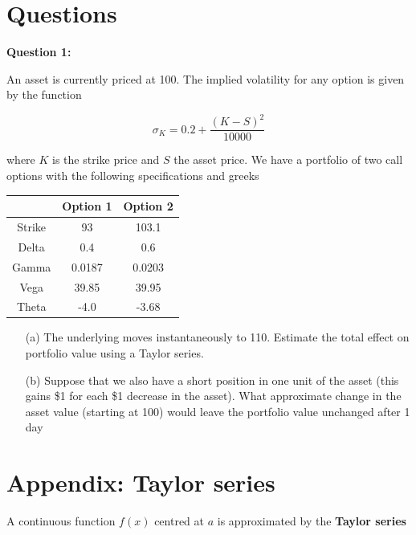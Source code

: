 \section*{Questions}

\textbf{Question 1:}

An asset is currently priced at 100. The implied volatility for any option is given by the function

\[ \sigma_K =  0.2 +  \frac{(K-S)^2}{10000} \]

where $K$ is the strike price and $S$ the asset price. We have a portfolio of two call options with the following specifications and greeks


\begin{center}
\begin{tabular}{|c|c|c|}
\hline
 & Option 1 & Option 2\\
 \hline
 Strike & 93 & 103.1\\
 Delta & 0.4 & 0.6\\
 Gamma & 0.0187 & 0.0203\\
 Vega & 39.85 & 39.95\\
 Theta & -4.0 & -3.68\\
\hline
\end{tabular}
\end{center}

\begin{itemize}
\item[(a)] The underlying moves instantaneously to 110. Estimate the total effect on portfolio value using a Taylor series.
\item[(b)] Suppose that we also have a short position in one unit of the asset (this gains \$1 for each \$1 decrease in the asset). What approximate change in the asset value (starting at 100) would leave the portfolio value unchanged after 1 day

\end{itemize}


\section*{Appendix: Taylor series}

A continuous function $f(x)$ centred at $a$ is approximated by the \textbf{Taylor series}


